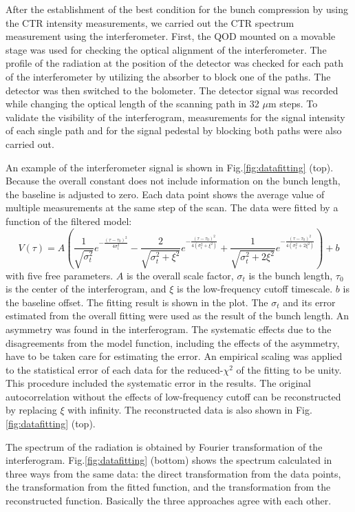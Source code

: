 \documentclass[review]{elsarticle}
\begin{document}
After the establishment of the best condition for the bunch compression
by using the CTR intensity measurements,
we carried out the CTR spectrum measurement using the interferometer.
First,
the QOD mounted on a movable stage
was used for checking the optical alignment of the interferometer.
The profile of the radiation at the position of the detector
was checked for each path of the interferometer
by utilizing the absorber to block one of the paths.
The detector was then switched to the bolometer.
The detector signal was recorded 
while changing the optical length of the scanning path in 32 $\mu$m steps. 
To validate the visibility of the interferogram,
measurements for the signal intensity of each single path
and for the signal pedestal by blocking both paths
were also carried out.


An example of the interferometer signal is shown in Fig.\ref{fig:datafitting} (top).
Because the overall constant does not include information on the bunch length,
the baseline is adjusted to zero.
Each data point shows the average value of multiple measurements
at the same step of the scan.
The data were fitted by a function of the filtered model:
\begin{equation}
V(\tau) =A \left(
\frac{1}{\sqrt{\sigma_t^2}} e^{-\frac{(\tau-\tau_0)^2}{4 \sigma_t^2}}
- \frac{2}{\sqrt{\sigma_t^2 + \xi^2}} e^{-\frac{(\tau-\tau_0)^2}{4(\sigma_t^2 + \xi^2)}}
+ \frac{1}{\sqrt{\sigma_t^2 + 2 \xi^2}} e^{-\frac{(\tau-\tau_0)^2}{4(\sigma_t^2 + 2 \xi^2)}}
\right) + b
\end{equation}
with five free parameters.
$A$ is the overall scale factor, 
$\sigma_t$ is the bunch length, 
$\tau_0$ is the center of the interferogram, 
and $\xi$ is the low-frequency cutoff timescale.
$b$ is the baseline offset.
The fitting result is shown in the plot.
The $\sigma_t$ and its error estimated from the overall fitting
were used as the result of the bunch length.
An asymmetry was found in the interferogram.
The systematic effects due to the disagreements from the model function,
including the effects of the asymmetry, have to be taken care for estimating the error.
An empirical scaling was applied to the statistical error of each data
for the reduced-$\chi^2$ of the fitting to be unity.
This procedure included the systematic error in the results.
The original autocorrelation without the effects of low-frequency cutoff
can be reconstructed 
by replacing $\xi$ with infinity. 
The reconstructed data is also shown in Fig.\ref{fig:datafitting} (top).

The spectrum of the radiation is obtained 
by Fourier transformation of the interferogram.
Fig.\ref{fig:datafitting} (bottom) shows the spectrum calculated in three ways from the same data:
the direct transformation from the data points,
the transformation from the fitted function,
and the transformation from the reconstructed function.
Basically the three approaches agree with each other.
\end{document}
